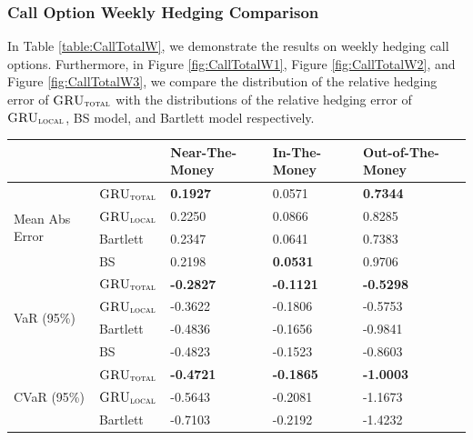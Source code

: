 \documentclass[letterpaper,12pt,titlepage,oneside,final]{book}
\numberwithin{equation}{section}
\theoremstyle{definition}
\newcommand{\modelT}{\textsc{GRU}_{\textsc{total}}}
\newcommand{\modelL}{\textsc{GRU}_{\textsc{local}}}
\begin{document}
\subsubsection{Call Option Weekly Hedging Comparison}
In Table \ref{table:CallTotalW}, we demonstrate the results on weekly hedging call options. Furthermore, in Figure \ref{fig:CallTotalW1}, Figure \ref{fig:CallTotalW2}, and  Figure \ref{fig:CallTotalW3}, we compare the distribution of the relative hedging error of $\modelT$ with the distributions of the relative hedging error of $\modelL$, BS model, and Bartlett model respectively.
\begin{table}[htp!]
	\centering
	\begin{tabular}{ll|l|l|l|}
		\cline{3-5}
		&          & Near-The-Money   & In-The-Money     & Out-of-The-Money \\ \hline
		\multicolumn{1}{|l|}{\multirow{4}{*}{Mean Abs Error}} & $\modelT$    & \textbf{0.1927}  & 0.0571  & \textbf{0.7344}  \\  
		\multicolumn{1}{|l|}{}                                & $\modelL$    & 0.2250           & 0.0866           & 0.8285           \\  
		\multicolumn{1}{|l|}{}                                & Bartlett & 0.2347           & 0.0641           & 0.7383           \\  
		\multicolumn{1}{|l|}{}                                & BS       & 0.2198           &\textbf{0.0531}           & 0.9706           \\ \hline
		\multicolumn{1}{|l|}{\multirow{4}{*}{VaR (95\%)}}     & $\modelT$    & \textbf{-0.2827} & \textbf{-0.1121} & \textbf{-0.5298} \\  
		\multicolumn{1}{|l|}{}                                & $\modelL$    & -0.3622          & -0.1806          & -0.5753          \\  
		\multicolumn{1}{|l|}{}                                & Bartlett & -0.4836          & -0.1656          & -0.9841          \\  
		\multicolumn{1}{|l|}{}                                & BS       & -0.4823          & -0.1523          & -0.8603          \\ \hline
		\multicolumn{1}{|l|}{\multirow{4}{*}{CVaR (95\%)}}    & $\modelT$    & \textbf{-0.4721} & \textbf{-0.1865} & \textbf{-1.0003} \\  
		\multicolumn{1}{|l|}{}                                & $\modelL$    & -0.5643          & -0.2081          & -1.1673          \\  
		\multicolumn{1}{|l|}{}                                & Bartlett & -0.7103          & -0.2192          & -1.4232          \\  

\end{tabular}
\end{table}
\end{document}
